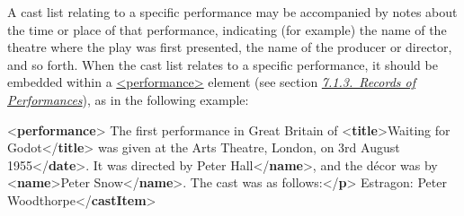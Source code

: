 A cast list relating to a specific performance may be accompanied by notes about the time or place of that performance, indicating (for example) the name of the theatre where the play was first presented, the name of the producer or director, and so forth. When the cast list relates to a specific performance, it should be embedded within a \hyperref[TEI.performance]{<performance>} element (see section \textit{\hyperref[DRPERF]{7.1.3.\ Records of Performances}}), as in the following example: \par\bgroup{}\exampleFont \begin{shaded}\noindent\mbox{}{<\textbf{performance}>}\mbox{}\newline 
{}The first performance in Great Britain of {<\textbf{title}>}Waiting for\mbox{}\newline 
\hspace*{1em}\hspace*{1em}\hspace*{1em}\hspace*{1em} Godot{</\textbf{title}>} was given at the Arts Theatre, London, on\mbox{}\newline 
{}3rd August 1955{</\textbf{date}>}. It was directed by\mbox{}\newline 
{}Peter Hall{</\textbf{name}>}, and the décor was by {<\textbf{name}>}Peter\mbox{}\newline 
\hspace*{1em}\hspace*{1em}\hspace*{1em}\hspace*{1em} Snow{</\textbf{name}>}. The cast was as follows:{</\textbf{p}>}\mbox{}\newline 
{}\mbox{}\newline 
\hspace*{1em}Estragon: Peter Woodthorpe{</\textbf{castItem}>}\mbox{}\newline 

\end{shaded}

